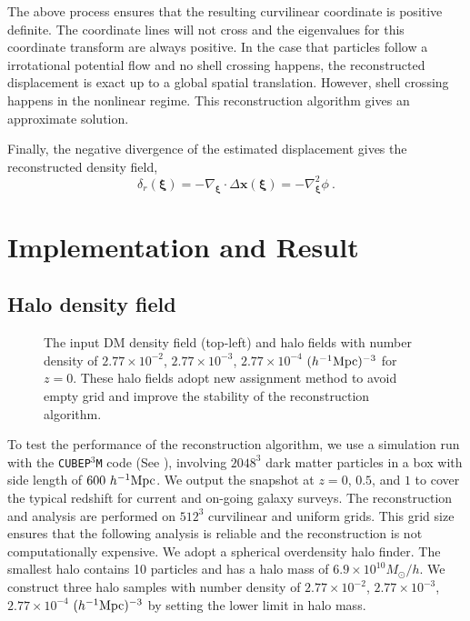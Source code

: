 \documentclass[iop]{emulateapj}
\newcommand{\be}{\begin{equation}}
\newcommand{\ee}{\end{equation}}
\newcommand{\mpch}{h^{-1} {\rm Mpc}}
\newcommand{\Msun}{M_{\odot}}
\newcommand{\vecx}{{\bm{x}}}
\newcommand{\vecxi}{{\bm{\xi}}}
\begin{document}
{The above process ensures that the resulting curvilinear coordinate is positive definite.
The coordinate lines will not cross and the eigenvalues for this coordinate transform are always positive.
In the case that particles follow a irrotational potential flow and no shell crossing happens,
 the reconstructed displacement is exact up to a global spatial translation.
However, shell crossing happens in the nonlinear regime.  This reconstruction algorithm gives an approximate solution.

Finally, the negative divergence of the estimated displacement gives the reconstructed density field,
\be
\delta_r(\vecxi)=-\nabla_\vecxi\cdot\Delta\vecx(\vecxi)=-\nabla_\vecxi^2\phi\ .
\ee



\section{Implementation and Result}
\label{sec:result}

\subsection{Halo density field}
\label{sec:massassign}

\begin{figure*}
\epsfxsize=18cm
\caption{The input DM density field (top-left) and halo fields with number density of $2.77\times 10^{-2}$,
$2.77\times 10^{-3}$, $2.77\times 10^{-4}$ $(\mpch)^{-3}$ for $z=0$.
These halo fields adopt new assignment method to avoid empty grid and improve the stability of the reconstruction algorithm.}
\label{fig:maps}
\end{figure*}

To test the performance of the reconstruction algorithm,
we use a simulation run with the \texttt{CUBEP$^3$M} code (See \cite{cubep3m}), involving $2048^3$ dark matter particles in a box with side length of $600\ \mpch$.
We output the snapshot at $z=0$, $0.5$, and $1$ to cover the typical redshift for current and on-going galaxy surveys.
The reconstruction and analysis are performed on $512^3$ curvilinear and uniform grids.
This grid size ensures that the following analysis is reliable and the reconstruction is not computationally expensive.
We adopt a spherical overdensity halo finder.
The smallest halo contains 10 particles and has a halo mass of $6.9\times 10^{10}\Msun/h$.
We construct three halo samples with number density of $2.77\times 10^{-2}$, $2.77\times 10^{-3}$, $2.77\times 10^{-4}$ $(\mpch)^{-3}$ by setting the lower limit in halo mass.

}
\end{document}
